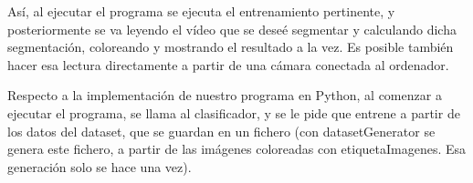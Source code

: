 \documentclass{article}
\begin{document}
	Así, al ejecutar el programa se ejecuta el entrenamiento pertinente, y posteriormente se va leyendo el vídeo que se deseé segmentar y calculando dicha segmentación, coloreando y mostrando el resultado a la vez. Es posible también hacer esa lectura directamente a partir de una cámara conectada al ordenador.



	Respecto a la implementación de nuestro programa en Python, al comenzar a ejecutar el programa, se llama al clasificador, y se le pide que entrene a partir de los datos del dataset, que se guardan en un fichero (con datasetGenerator se genera este fichero, a partir de las imágenes coloreadas con etiquetaImagenes. Esa generación solo se hace una vez). 
\end{document}

